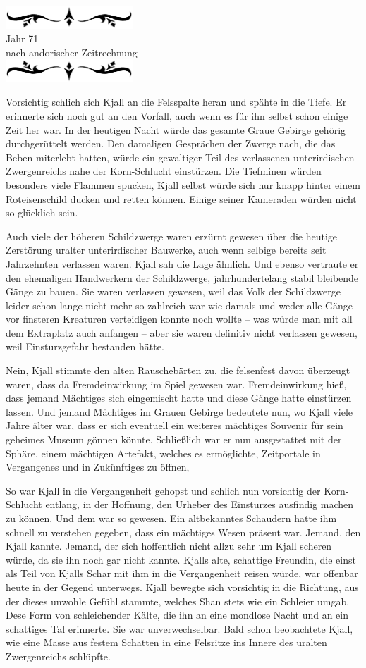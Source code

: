 \documentclass[10pt, a4paper, oneside]{book}
\newcommand{\az}[1]{%
    \begin{center}
        \includegraphics[width=180px]{Das Erbe des Wunderkindes/verzierung1.png}\\
        {\Huge #1} \\
        {nach andorischer Zeitrechnung}\\
        \includegraphics[width=180px]{Das Erbe des Wunderkindes/verzierung2.png}
    \end{center}
    \extramarks{}{#1 a.Z.}
}
\begin{document}
\az{Jahr 71}

Vorsichtig schlich sich Kjall an die Felsspalte heran und spähte in die Tiefe. Er erinnerte sich noch gut an den Vorfall, auch wenn es für ihn selbst schon einige Zeit her war. In der heutigen Nacht würde das gesamte Graue Gebirge gehörig durchgerüttelt werden. Den damaligen Gesprächen der Zwerge nach, die das Beben miterlebt hatten, würde ein gewaltiger Teil des verlassenen unterirdischen Zwergenreichs nahe der Korn-Schlucht einstürzen. Die Tiefminen würden besonders viele Flammen spucken, Kjall selbst würde sich nur knapp hinter einem Roteisenschild ducken und retten können. Einige seiner Kameraden würden nicht so glücklich sein.

Auch viele der höheren Schildzwerge waren erzürnt gewesen über die heutige Zerstörung uralter unterirdischer Bauwerke, auch wenn selbige bereits seit Jahrzehnten verlassen waren. Kjall sah die Lage ähnlich. Und ebenso vertraute er den ehemaligen Handwerkern der Schildzwerge, jahrhundertelang stabil bleibende Gänge zu bauen. Sie waren verlassen gewesen, weil das Volk der Schildzwerge leider schon lange nicht mehr so zahlreich war wie damals und weder alle Gänge vor finsteren Kreaturen verteidigen konnte noch wollte – was würde man mit all dem Extraplatz auch anfangen – aber sie waren definitiv nicht verlassen gewesen, weil Einsturzgefahr bestanden hätte.

Nein, Kjall stimmte den alten Rauschebärten zu, die felsenfest davon überzeugt waren, dass da Fremdeinwirkung im Spiel gewesen war. Fremdeinwirkung hieß, dass jemand Mächtiges sich eingemischt hatte und diese Gänge hatte einstürzen lassen. Und jemand Mächtiges im Grauen Gebirge bedeutete nun, wo Kjall viele Jahre älter war, dass er sich eventuell ein weiteres mächtiges Souvenir für sein geheimes Museum gönnen könnte. Schließlich war er nun ausgestattet mit der Sphäre, einem mächtigen Artefakt, welches es ermöglichte, Zeitportale in Vergangenes und in Zukünftiges zu öffnen,

So war Kjall in die Vergangenheit gehopst und schlich nun vorsichtig der Korn-Schlucht entlang, in der Hoffnung, den Urheber des Einsturzes ausfindig machen zu können. Und dem war so gewesen. Ein altbekanntes Schaudern hatte ihm schnell zu verstehen gegeben, dass ein mächtiges Wesen präsent war. Jemand, den Kjall kannte. Jemand, der sich hoffentlich nicht allzu sehr um Kjall scheren würde, da sie ihn noch gar nicht kannte. Kjalls alte, schattige Freundin, die einst als Teil von Kjalls Schar mit ihm in die Vergangenheit reisen würde, war offenbar heute in der Gegend unterwegs. Kjall bewegte sich vorsichtig in die Richtung, aus der dieses unwohle Gefühl stammte, welches Shan stets wie ein Schleier umgab. Dese Form von schleichender Kälte, die ihn an eine mondlose Nacht und an ein schattiges Tal erinnerte. Sie war unverwechselbar. Bald schon beobachtete Kjall, wie eine Masse aus festem Schatten in eine Felsritze ins Innere des uralten Zwergenreichs schlüpfte.
\end{document}
